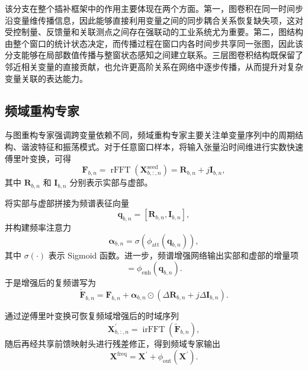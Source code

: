该分支在整个插补框架中的作用主要体现在两个方面。第一，图卷积在同一时间步沿变量维传播信息，因此能够直接利用变量之间的同步耦合关系恢复缺失项，这对受控制量、反馈量和关联测点之间存在强联动的工业系统尤为重要。第二，图结构由整个窗口的统计状态决定，而传播过程在窗口内各时间步共享同一张图，因此该分支能够在局部数值传播与整窗状态感知之间建立联系。三层图卷积结构既保留了邻近相关变量的直接贡献，也允许更高阶关系在网络中逐步传播，从而提升对复杂变量关联的表达能力。

\subsection{频域重构专家}

与图重构专家强调跨变量依赖不同，频域重构专家主要关注单变量序列中的周期结构、谐波特征和振荡模式。对于任意窗口样本，将输入张量沿时间维进行实数快速傅里叶变换，可得
\begin{equation}
    \mathbf{F}_{b,n} = \operatorname{rFFT}\!\left(\mathbf{X}_{b,:,n}^{\mathrm{seed}}\right)
    = \mathbf{R}_{b,n} + j \mathbf{I}_{b,n},
\end{equation}
其中 $\mathbf{R}_{b,n}$ 和 $\mathbf{I}_{b,n}$ 分别表示实部与虚部。

将实部与虚部拼接为频谱表征向量
\begin{equation}
    \mathbf{q}_{b,n} = [\mathbf{R}_{b,n},\mathbf{I}_{b,n}],
\end{equation}
并构建频率注意力
\begin{equation}
    \boldsymbol{\alpha}_{b,n} = \sigma\!\left(\phi_{\mathrm{att}}(\mathbf{q}_{b,n})\right),
\end{equation}
其中 $\sigma(\cdot)$ 表示 Sigmoid 函数。进一步，频谱增强网络输出实部和虚部的增量项
\begin{equation}
    [\Delta \mathbf{R}_{b,n}, \Delta \mathbf{I}_{b,n}] = \phi_{\mathrm{enh}}(\mathbf{q}_{b,n}).
\end{equation}
于是增强后的复频谱写为
\begin{equation}
    \tilde{\mathbf{F}}_{b,n}
    =
    \mathbf{F}_{b,n}
    +
    \boldsymbol{\alpha}_{b,n} \odot
    \left(
        \Delta \mathbf{R}_{b,n} + j \Delta \mathbf{I}_{b,n}
    \right).
\end{equation}

通过逆傅里叶变换可恢复频域增强后的时域序列
\begin{equation}
    \mathbf{X}_{b,:,n}^{\prime} = \operatorname{irFFT}(\tilde{\mathbf{F}}_{b,n}),
\end{equation}
随后再经共享前馈映射头进行残差修正，得到频域专家输出
\begin{equation}
    \mathbf{X}^{\mathrm{freq}} = \mathbf{X}^{\prime} + \phi_{\mathrm{out}}(\mathbf{X}^{\prime}).
\end{equation}


